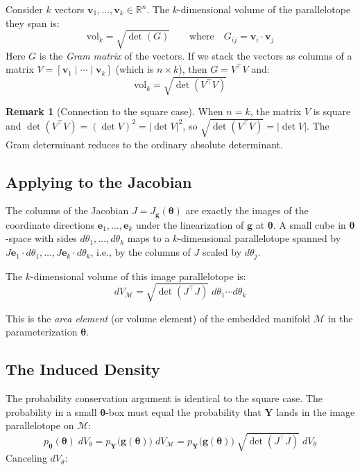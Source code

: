 \documentclass[11pt,a4paper]{article}
\theoremstyle{definition}
\newtheorem{remark}[theorem]{Remark}
\newcommand{\btheta}{\boldsymbol{\theta}}
\begin{document}
Consider $k$ vectors $\mathbf{v}_1, \ldots, \mathbf{v}_k \in \mathbb{R}^n$.
The $k$-dimensional volume of the parallelotope they span is:
\begin{equation}
    \label{eq:gram_volume}
    \text{vol}_k = \sqrt{\det(G)}
    \qquad \text{where} \quad G_{ij} = \mathbf{v}_i \cdot \mathbf{v}_j
\end{equation}
Here $G$ is the \emph{Gram matrix} of the vectors. If we stack the vectors as
columns of a matrix $V = [\mathbf{v}_1 \mid \cdots \mid \mathbf{v}_k]$ (which
is $n \times k$), then $G = V^\top V$ and:
\begin{equation}
    \text{vol}_k = \sqrt{\det(V^\top V)}
\end{equation}

\begin{remark}[Connection to the square case]
When $n = k$, the matrix $V$ is square and
$\det(V^\top V) = (\det V)^2 = |\!\det V|^2$, so
$\sqrt{\det(V^\top V)} = |\!\det V|$. The Gram determinant reduces to the
ordinary absolute determinant.
\end{remark}

\subsection{Applying to the Jacobian}

The columns of the Jacobian $J = J_{\mathbf{g}}(\btheta)$ are exactly the
images of the coordinate directions $\mathbf{e}_1, \ldots, \mathbf{e}_k$
under the linearization of $\mathbf{g}$ at $\btheta$. A small cube in
$\btheta$-space with sides $d\theta_1, \ldots, d\theta_k$ maps to a
$k$-dimensional parallelotope spanned by
$J\mathbf{e}_1 \cdot d\theta_1, \ldots, J\mathbf{e}_k \cdot d\theta_k$,
i.e., by the columns of $J$ scaled by $d\theta_j$.

The $k$-dimensional volume of this image parallelotope is:
\begin{equation}
    dV_{\mathcal{M}} = \sqrt{\det(J^\top J)} \; d\theta_1 \cdots d\theta_k
\end{equation}

This is the \emph{area element} (or volume element) of the embedded manifold
$\mathcal{M}$ in the parameterization $\btheta$.

\subsection{The Induced Density}

The probability conservation argument is identical to the square case. The
probability in a small $\btheta$-box must equal the probability that
$\mathbf{Y}$ lands in the image parallelotope on $\mathcal{M}$:
\begin{equation}
    p_{\btheta}(\btheta) \; dV_\theta
    = p_{\mathbf{Y}}\!\big(\mathbf{g}(\btheta)\big) \; dV_{\mathcal{M}}
    = p_{\mathbf{Y}}\!\big(\mathbf{g}(\btheta)\big) \;
    \sqrt{\det(J^\top J)} \; dV_\theta
\end{equation}
Canceling $dV_\theta$:
\end{document}
